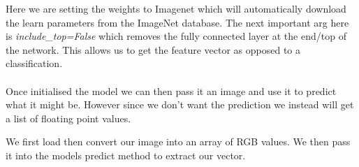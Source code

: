 \documentclass[12pt]{article} %
\begin{document}
\begin{figure}[H] %
 \end{figure}

Here we are setting the weights to Imagenet which will automatically download the learn parameters from the ImageNet database. The next important arg here is \textit{ include\_top=False} which removes the fully connected layer at the end/top of the network. This allows us to get the feature vector as opposed to a classification.\\
\\
Once initialised the model we can then pass it an image and use it to predict what it might be. However since we don’t want the prediction we instead will get a list of floating point values.

\begin{figure}[H] %
 \end{figure}

We first load then convert our image into an array of RGB values. We then pass it into the models predict method to extract our vector.\\
\end{document}
